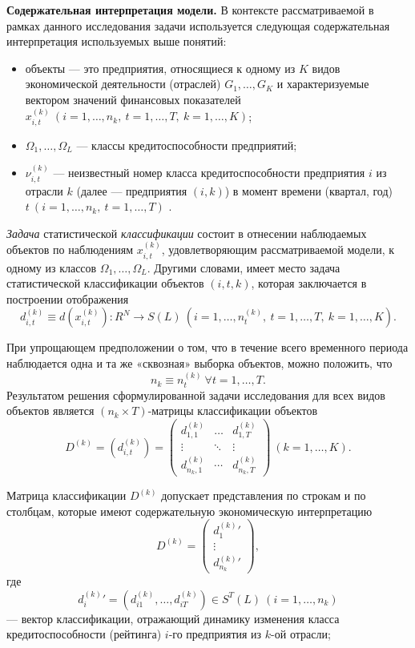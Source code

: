 \documentclass[14pt,a4paper]{extarticle}
\begin{document}
\textbf{Содержательная интерпретация модели.} В контексте рассматриваемой в рамках данного исследования задачи используется следующая содержательная интерпретация используемых выше понятий:
\begin{itemize}
    \item объекты --- это предприятия, относящиеся к одному из $K$ видов экономической деятельности (отраслей) $G_{1},\ldots,G_{K}$ и характеризуемые вектором значений финансовых показателей $x_{i,t}^{(k)}\ (i=1,\ldots,n_{k},\ t=1,\ldots,T,\ k=1,\ldots,K)$;
    \item $\Omega_{1},\ldots,\Omega_{L}$ --- классы кредитоспособности предприятий;
    \item $\nu_{i,t}^{(k)}$ --- неизвестный номер класса кредитоспособности предприятия $i$ из отрасли $k$ (далее --- предприятия $(i,k)$) в момент времени (квартал, год) $t\ (i=1,\ldots,n_{k},\ t=1,\ldots,T)$ \cite{malugin2013}.
\end{itemize}

\textit{Задача} статистической \textit{классификации} состоит в отнесении наблюдаемых объектов по наблюдениям $x_{i,t}^{(k)}$, удовлетворяющим рассматриваемой модели, к одному из классов $\Omega_{1},\ldots,\Omega_{L}$. Другими словами, имеет место задача статистической классификации объектов $(i,t,k)$, которая заключается в построении отображения
\[
d_{i,t}^{(k)} \equiv d(x_{i,t}^{(k)}): R^{N} \rightarrow S(L)\ (i=1,\ldots,n_{t}^{(k)},\ t=1,\ldots,T,\ k=1,\ldots,K).
\]

При упрощающем предположении о том, что в течение всего временного периода наблюдается одна и та же «сквозная» выборка объектов, можно положить, что
\[
n_{k} \equiv n_{t}^{(k)}\ \forall t=1,\ldots,T.
\]
Результатом решения сформулированной задачи исследования для всех видов объектов является $(n_{k} \times T)$-матрицы классификации объектов
\[
D^{(k)} = \left( d_{i,t}^{(k)} \right) = \begin{pmatrix}
d_{1,1}^{(k)} & \ldots & d_{1,T}^{(k)} \\
\vdots & \ddots & \vdots \\
d_{n_{k},1}^{(k)} & \cdots & d_{n_{k},T}^{(k)}
\end{pmatrix}\ (k=1,\ldots,K).
\]

Матрица классификации $D^{(k)}$ допускает представления по строкам и по столбцам, которые имеют содержательную экономическую интерпретацию
\[
D^{(k)} = \begin{pmatrix}
{d_{1}^{(k)}}' \\
\vdots \\
{d_{n_{k}}^{(k)}}'
\end{pmatrix},
\]
где
\[
{d_{i}^{(k)}}' = \left( d_{i1}^{(k)},\ldots,d_{iT}^{(k)} \right) \in S^{T}(L)\ (i=1,\ldots,n_{k})
\]
--- вектор классификации, отражающий динамику изменения класса кредитоспособности (рейтинга) $i$-го предприятия из $k$-ой отрасли;
\end{document}
